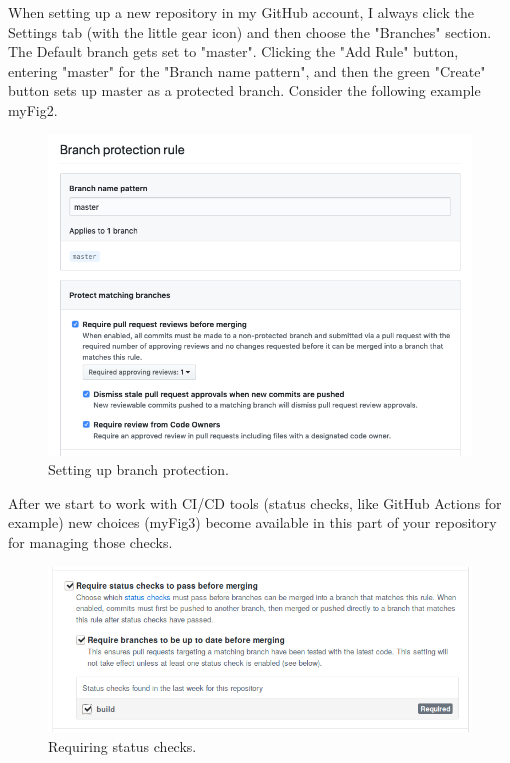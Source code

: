 \justify
When setting up a new repository in my GitHub account, I always click
the Settings tab (with the little gear icon) and then choose the
"Branches" section. The Default branch gets set to "master". Clicking
the "Add Rule" button, entering "master" for the "Branch name pattern",
and then the green "Create" button sets up master as a protected branch.
Consider the following example {myFig2}.

\begin{figure}
      \includegraphics[scale=0.50]{../images/github-branch-protection.png}
      \caption{Setting up branch protection.}
\end{figure}

\justify
After we start to work with CI/CD tools (status checks, like GitHub
Actions for example) new choices ({myFig3}) become available in this
part of your repository for managing those checks.

\begin{figure}
      \includegraphics[scale=0.53]{../images/guthub-status-check.png}
      \caption{Requiring status checks.}
\end{figure}

